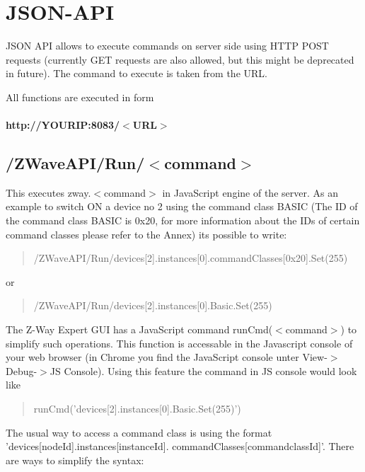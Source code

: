 \section{JSON-API}
\label{jsapi}
JSON API allows to execute commands on server side using HTTP POST requests 
(currently GET requests are also allowed, but this might be deprecated in future). 
The command to execute is taken from the URL.

All functions are executed in form 

\paragraph{http://YOURIP:8083/$<$URL$>$}


\subsection{/ZWaveAPI/Run/$<$command$>$}

This executes zway.$<$command$>$ in JavaScript engine of the server. As an example to 
switch ON a device no 2 using the command class BASIC (The ID of the command class BASIC is 0x20, for more
information about the IDs of certain command classes please refer to the Annex) its 
possible to write:

\begin{quote}/ZWaveAPI/Run/devices[2].instances[0].commandClasses[0x20].Set(255)\end{quote}

or

\begin{quote}/ZWaveAPI/Run/devices[2].instances[0].Basic.Set(255)\end{quote}



The Z-Way Expert GUI has a JavaScript command runCmd($<$command$>$) to simplify such 
operations. This function  is accessable in the Javascript console of your web browser 
(in Chrome you find the JavaScript  console unter View-$>$Debug-$>$JS Console). Using 
this feature the command in JS console would look like

\begin{quote}runCmd('devices[2].instances[0].Basic.Set(255)')\end{quote}


The usual way to access a command class is using the format \\'devices[nodeId].instances[instanceId].
commandClasses[commandclassId]'.
There are ways to simplify the syntax:

